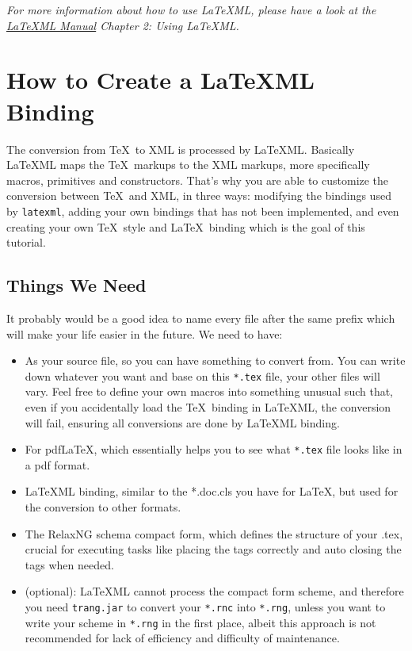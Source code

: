 \documentclass{article}
\begin{document}
\begin{tcolorbox}
\emph{For more information about how to use \LaTeX ML, please have a look at the \href{http://dlmf.nist.gov/LaTeXML/manual.pdf}{\LaTeX ML Manual} Chapter 2: Using \LaTeX ML.}
\end{tcolorbox}

\section{How to Create a LaTeXML Binding}
The conversion from \TeX\  to XML is processed by \LaTeX ML. Basically \LaTeX ML maps the \TeX \ markups to the XML markups, more specifically macros, primitives and constructors. That's why you are able to customize the conversion between \TeX\  and XML, in three ways: modifying the bindings used by \texttt{latexml}, adding your own bindings that has not been implemented, and even creating your own \TeX \ style and \LaTeX\  binding which is the goal of this tutorial.
\subsection{Things We Need}
It probably would be a good idea to name every file after the same prefix which will make your life easier in the future. We need to have:
\begin{itemize}
\item[\texttt{*.tex}] As your source file, so you can have something to convert from. You can write down whatever you want and base on this \texttt{*.tex} file, your other files will vary. Feel free to define your own macros into something unusual such that, even if you accidentally load the \TeX\ binding in \LaTeX ML, the conversion will fail, ensuring all conversions are done by \LaTeX ML binding. \\

\item[\texttt{*.cls}] For pdf\LaTeX, which essentially helps you to see what \texttt{*.tex} file looks like in a pdf format. \\ 

\item[\texttt{*.cls.ltxml}] \LaTeX ML binding, similar to the *.doc.cls you have for \LaTeX, but used for the conversion to other formats. \\

\item[\texttt{*.rnc}] The RelaxNG schema compact form, which defines the structure of your .tex, crucial for executing tasks like placing the tags correctly and auto closing the tags when needed. \\

\item[\texttt{trang.jar}](optional): \LaTeX ML cannot process the compact form scheme, and therefore you need \texttt{trang.jar} to convert your \texttt{*.rnc} into \texttt{*.rng}, unless you want to write your scheme in \texttt{*.rng} in the first place, albeit this approach is not recommended for lack of efficiency and difficulty of maintenance.
\end{itemize}
\end{document}
